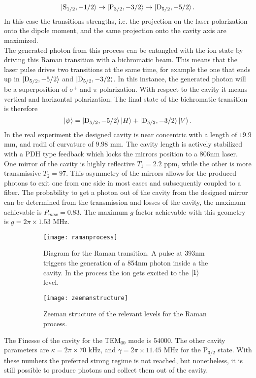 \begin{equation}
\ket{\text{S}_{1/2},-1/2}\to\ket{\text{P}_{3/2},-3/2} \to \ket{\text{D}_{5/2},-5/2}.
\end{equation}
In this case the transitions strengths, i.e. the projection on the laser polarization onto the dipole moment, and the same projection onto the cavity axis are maximized.\\
The generated photon from this process can be entangled with the ion state by driving this Raman transition with a bichromatic beam. This means that the laser pulse drives two transitions at the same time, for example the one that ends up in $\ket{\text{D}_{5/2},-5/2}$ and $\ket{\text{D}_{5/2},-3/2}$. In this instance, the generated photon will be a superposition of $\sigma^+$ and $\pi$ polarization. With respect to the cavity it means vertical and horizontal polarization. The final state of the bichromatic transition is therefore
\begin{equation}
\ket{\psi} = \ket{\text{D}_{5/2},-5/2}\ket{H} + \ket{\text{D}_{5/2},-3/2}\ket{V}.
\end{equation}
In the real experiment the designed cavity is near concentric with a length of $19.9$ mm, and radii of curvature of $9.98$ mm. The cavity length is actively stabilized with a PDH type feedback which locks the mirrors position to a 806nm laser. One mirror of the cavity is highly reflective $T_1 = 2.2$ ppm, while the other is more transmissive $T_2 = 97$. This asymmetry of the mirrors allows for the produced photons to exit one from one side in most cases and subsequently coupled to a fiber. The probability to get a photon out of the cavity from the designed mirror can be determined from the transmission and losses of the cavity, the maximum achievable is $P_{max} = 0.83$. The maximum $g$ factor achievable with this geometry is $g = 2\pi \times 1.53$ MHz.
\begin{figure}[H]
     \centering
     \begin{subfigure}[b]{0.49\textwidth}
         \centering
         \texttt{[image: ramanprocess]}
         \caption{Diagram for the Raman transition. A pulse at 393nm triggers the generation of a 854nm photon inside a the cavity. In the process the ion gets excited to the $\ket{1}$ level.}
     \end{subfigure}
     \hfill
     \begin{subfigure}[b]{0.49\textwidth}
         \centering
         \texttt{[image: zeemanstructure]}
         \caption{Zeeman structure of the relevant levels for the Raman process.}
         \vspace{1em}
     \end{subfigure}
        \caption{}
      \label{ramanprocess}
\end{figure}
 The Finesse of the cavity for the TEM$_{00}$ mode is 54000. The other cavity parameters are $\kappa = 2\pi \times 70$ kHz, and $\gamma = 2\pi\times 11.45$ MHz for the $\text{P}_{3/2}$ state. With these numbers the preferred strong regime is not reached, but nonetheless,  it is still possible to produce photons and collect them out of the cavity.

